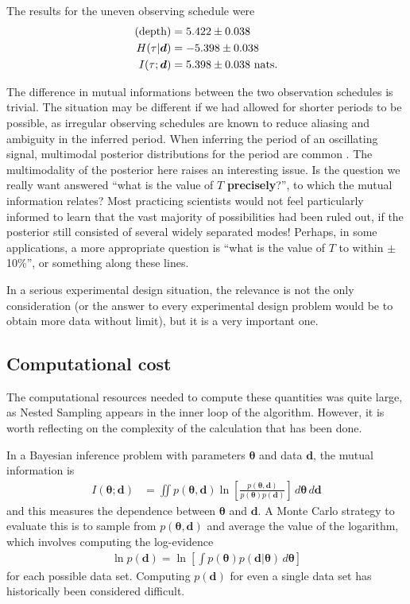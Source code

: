 \documentclass[entropy,article,accept,oneauthor,pdftex,10pt,a4paper]{mdpi}
\renewcommand{\d}{\boldsymbol{d}}
\newcommand{\x}{\boldsymbol{\theta}}
\newcommand{\depth}{(\textnormal{depth})}
\begin{document}
The results for the uneven observing schedule were
\begin{align}
\depth       &=  5.422 \pm 0.038 \\
H(\tau | \d) &= -5.398 \pm 0.038 \\
I(\tau; \d)   &=  5.398 \pm 0.038 \textnormal{ nats}.
\end{align}

The difference in mutual informations between the two observation
schedules is trivial.
The situation may be different if we
had allowed for shorter periods to be possible, as irregular observing
schedules are known to reduce aliasing and ambiguity in the inferred period.
When inferring the period of an oscillating signal, multimodal posterior
distributions for the period are common \citep{gregoryTrimodal, exoplanet}.
The multimodality of the posterior here raises an interesting issue. Is
the question we really want answered ``what is the value of $T$
{\bf precisely}?'', to which the mutual information relates?
Most practicing scientists would not feel particularly informed to learn
that the vast majority of possibilities had been ruled out, if the
posterior still consisted of several widely separated modes!
Perhaps, in some applications, a more appropriate question is
``what is the value of $T$ to within $\pm$ 10\%'', or something along these
lines.

In a serious experimental design situation, the relevance is not the only
consideration (or the answer to every experimental design problem would
be to obtain more data without limit), but it is a very important one.

\subsection{Computational cost}

The computational resources needed to compute these quantities was quite large,
as Nested Sampling appears in the inner loop of the algorithm.
However, it is worth reflecting on the complexity of the calculation that
has been done.

In a Bayesian inference problem with parameters $\x$ and data $\d$, the
mutual information is
\begin{align}
I(\x; \d) &= \iint p(\x, \d)
                        \ln \left[\frac{p(\x, \d)}{p(\x)p(\d)}\right]
                        \, d\x \, d\d \label{eqn:mutual_info2}
\end{align}
and this measures the dependence between $\x$ and $\d$. A
Monte Carlo
strategy to evaluate this is to sample from $p(\x, \d)$ and average
the value of the logarithm, which involves computing the log-evidence
\begin{align}
\ln p(\d) = \ln\left[\int p(\x)p(\d | \x) \, d\x\right]
\end{align}
for each possible data set.
Computing $p(\d)$ for even a single
data set has historically been considered difficult.
\end{document}
